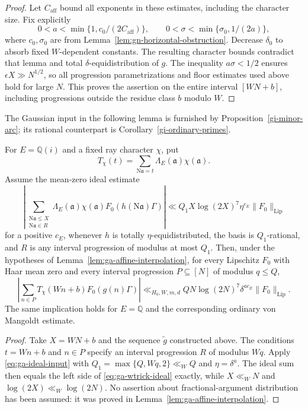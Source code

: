 \begin{proof}
Let $C_{\mathrm{aff}}$ bound all exponents in these estimates, including
the character size. Fix explicitly
\[
 0<a<\min\{1,c_0/(2C_{\mathrm{aff}})\},\qquad
 0<\sigma<\min\{\sigma_0,1/(2a)\},
\]
where $c_0,\sigma_0$ are from
Lemma~\ref{lem:gn-horizontal-obstruction}. Decrease $\delta_0$ to
absorb fixed $W$-dependent constants. The resulting character bounds
contradict that lemma and total $\delta$-equidistribution of $g$.
The inequality $a\sigma<1/2$ ensures $\epsilon X\gg N^{1/2}$, so all
progression parametrizations and floor estimates used above hold for
large $N$. This proves the assertion on the entire interval $[WN+b]$,
including progressions outside the residue class $b$ modulo $W$.
\end{proof}

The Gaussian input in the following lemma is furnished by
Proposition~\ref{gi-minor-arc}; its rational counterpart is
Corollary~\ref{gi-ordinary-primes}.

\begin{lemma}\label{lem:ga-wtrick-ma}
For $E=\mathbb Q(i)$ and a fixed ray character $\chi$, put
\[
 T_\chi(t)=\sum_{\mathrm N\mathfrak a=t}
             \Lambda_E(\mathfrak a)\chi(\mathfrak a).
\]
Assume the mean-zero ideal estimate
\begin{equation}\label{eq:ga-ideal-input}
 \left|\sum_{\substack{\mathrm N\mathfrak a\leq X\\
                          \mathrm N\mathfrak a\in R}}
  \Lambda_E(\mathfrak a)\chi(\mathfrak a)
             F_0(h(\mathrm N\mathfrak a)\Gamma)\right|
 \ll Q_1X\log(2X)^7\eta^{c_E}\|F_0\|_{\mathrm{Lip}}
\end{equation}
for a positive $c_E$, whenever $h$ is totally $\eta$-equidistributed,
the basis is $Q_1$-rational, and $R$ is any interval progression of
modulus at most $Q_1$. Then, under the hypotheses of
Lemma~\ref{lem:ga-affine-interpolation}, for every Lipschitz $F_0$
with Haar mean zero and every interval progression
$P\subseteq[N]$ of modulus $q\leq Q$,
\begin{equation}\label{eq:ga-wtrick-ideal}
 \left|\sum_{n\in P}T_\chi(Wn+b)F_0(g(n)\Gamma)\right|
 \ll_{H_0,W,m,d}QN\log(2N)^7\delta^{ac_E}
                     \|F_0\|_{\mathrm{Lip}}.
\end{equation}
The same implication holds for $E=\mathbb Q$ and the corresponding
ordinary von Mangoldt estimate.
\end{lemma}
\begin{proof}
Take $X=WN+b$ and the sequence $\widetilde g$ constructed above. The
conditions $t=Wn+b$ and $n\in P$ specify an interval progression $R$
of modulus $Wq$. Apply \eqref{eq:ga-ideal-input} with
$Q_1=\max\{Q,Wq,2\}\ll_WQ$ and $\eta=\delta^a$. The ideal sum
then equals the left side of \eqref{eq:ga-wtrick-ideal} exactly, while
$X\ll_WN$ and $\log(2X)\ll_W\log(2N)$. No assertion about
fractional-argument distribution has been assumed: it was proved in
Lemma~\ref{lem:ga-affine-interpolation}.
\end{proof}

